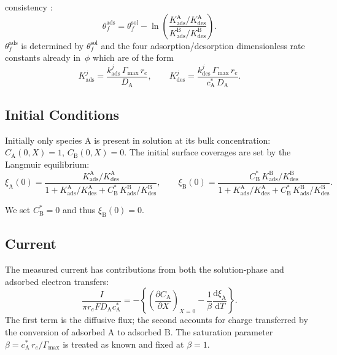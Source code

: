 consistency \cite{compton2014understanding}:
\begin{equation}\label{eq:ads-thetaf-relation}
  \theta_f^{\mathrm{ads}} = \theta_f^{\mathrm{sol}}
  - \ln\!\left(
    \frac{K_{\mathrm{ads}}^{\mathrm{A}} / K_{\mathrm{des}}^{\mathrm{A}}}
    {K_{\mathrm{ads}}^{\mathrm{B}} / K_{\mathrm{des}}^{\mathrm{B}}}
  \right).
\end{equation}
$\theta_f^{\mathrm{ads}}$ is determined by $\theta_f^{\mathrm{sol}}$
and the four adsorption/desorption dimensionless rate constants
already in~$\phi$ which are of the form
\begin{equation}\label{eq:ads-kads-kdes}
  K_{\mathrm{ads}}^{j}
  = \frac{k_{\mathrm{ads}}^{j}\,\Gamma_{\mathrm{max}}\,r_e}
  {D_\mathrm{A}},
  \qquad
  K_{\mathrm{des}}^{j}
  = \frac{k_{\mathrm{des}}^{j}\,\Gamma_{\mathrm{max}}\,r_e}
  {c_\mathrm{A}^*\,D_\mathrm{A}}.
\end{equation}

\subsection{Initial Conditions}

Initially only species $\mathrm{A}$ is present in solution at its bulk
concentration: $C_\mathrm{A}(0, X) = 1$, $C_\mathrm{B}(0, X) = 0$.
The initial surface coverages are set by the Langmuir equilibrium:
\begin{equation}\label{eq:ads-ic-coverage}
  \xi_\mathrm{A}(0) =
  \frac{K_{\mathrm{ads}}^{\mathrm{A}} / K_{\mathrm{des}}^{\mathrm{A}}}
  {1 + K_{\mathrm{ads}}^{\mathrm{A}} / K_{\mathrm{des}}^{\mathrm{A}}
    + C_\mathrm{B}^*\, K_{\mathrm{ads}}^{\mathrm{B}} /
  K_{\mathrm{des}}^{\mathrm{B}}},
  \qquad
  \xi_\mathrm{B}(0) =
  \frac{C_\mathrm{B}^*\, K_{\mathrm{ads}}^{\mathrm{B}} /
  K_{\mathrm{des}}^{\mathrm{B}}}
  {1 + K_{\mathrm{ads}}^{\mathrm{A}} / K_{\mathrm{des}}^{\mathrm{A}}
    + C_\mathrm{B}^*\, K_{\mathrm{ads}}^{\mathrm{B}} /
  K_{\mathrm{des}}^{\mathrm{B}}}.
\end{equation}

We set $C_\mathrm{B}^* = 0$ and thus $\xi_\mathrm{B}(0) = 0$.

\subsection{Current}

The measured current has contributions from both the solution-phase and
adsorbed electron transfers:
\begin{equation}\label{eq:ads-current}
  \frac{I}{\pi r_e F D_\mathrm{A} c_\mathrm{A}^*}
  = -\left\{
    \left(\frac{\partial C_\mathrm{A}}{\partial X}\right)_{X=0}
    - \frac{1}{\beta}
    \frac{\mathrm{d}\xi_\mathrm{A}}{\mathrm{d}T}
  \right\}.
\end{equation}
The first term is the diffusive flux; the second accounts for charge
transferred by the conversion of adsorbed $\mathrm{A}$ to adsorbed
$\mathrm{B}$. The saturation parameter $\beta = c_\mathrm{A}^*\,r_e/
\Gamma_{\mathrm{max}}$ is treated as known and fixed at $\beta = 1$.

